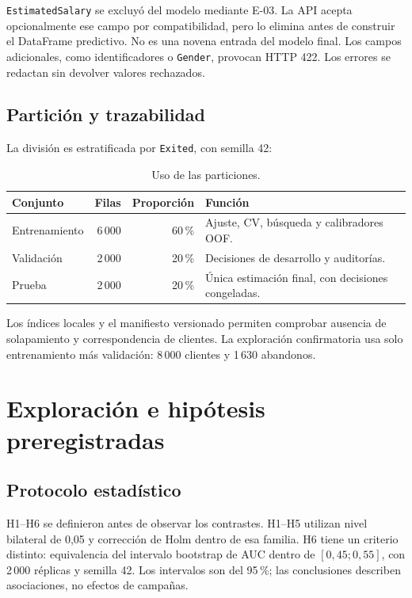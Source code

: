 \documentclass[11pt,a4paper,oneside]{report}
\begin{document}
\texttt{EstimatedSalary} se excluyó del modelo mediante E-03. La API acepta
opcionalmente ese campo por compatibilidad, pero lo elimina antes de construir
el DataFrame predictivo. No es una novena entrada del modelo final. Los campos
adicionales, como identificadores o \texttt{Gender}, provocan HTTP 422. Los
errores se redactan sin devolver valores rechazados.

\section{Partición y trazabilidad}
La división es estratificada por \texttt{Exited}, con semilla 42:
\begin{table}[htbp]\centering
\caption{Uso de las particiones.}
\begin{tabularx}{\textwidth}{@{}lrrX@{}}\toprule
Conjunto & Filas & Proporción & Función \\\midrule
Entrenamiento & 6\,000 & 60\,\% & Ajuste, CV, búsqueda y calibradores OOF. \\
Validación & 2\,000 & 20\,\% & Decisiones de desarrollo y auditorías. \\
Prueba & 2\,000 & 20\,\% & Única estimación final, con decisiones congeladas. \\\bottomrule
\end{tabularx}
\end{table}
Los índices locales y el manifiesto versionado permiten comprobar ausencia de
solapamiento y correspondencia de clientes. La exploración confirmatoria usa
solo entrenamiento más validación: 8\,000 clientes y 1\,630 abandonos.

\chapter{Exploración e hipótesis preregistradas}
\section{Protocolo estadístico}
H1--H6 se definieron antes de observar los contrastes. H1--H5 utilizan nivel
bilateral de 0,05 y corrección de Holm dentro de esa familia. H6 tiene un
criterio distinto: equivalencia del intervalo bootstrap de AUC dentro de
$[0{,}45;0{,}55]$, con 2\,000 réplicas y semilla 42. Los intervalos son del
95\,\%; las conclusiones describen asociaciones, no efectos de campañas.
\end{document}
